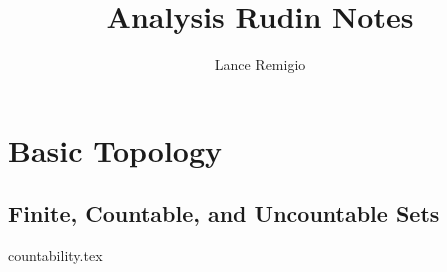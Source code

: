 \documentclass[11pt,a4paper]{book}
\title{Analysis Rudin Notes}
\author{Lance Remigio}
\begin{document}
\maketitle
\tableofcontents
\listoftheorems[ignoreall,show={theorem,defn}]

\chapter{Basic Topology}


\section{Finite, Countable, and Uncountable Sets}

{countability.tex}

\end{document}
